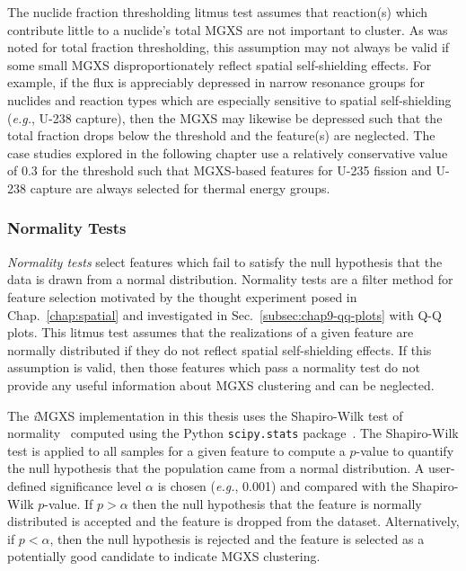The nuclide fraction thresholding litmus test assumes that reaction(s) which contribute little to a nuclide's total \ac{MGXS} are not important to cluster. As was noted for total fraction thresholding, this assumption may not always be valid if some small \ac{MGXS} disproportionately reflect spatial self-shielding effects. For example, if the flux is appreciably depressed in narrow resonance groups for nuclides and reaction types which are especially sensitive to spatial self-shielding (\textit{e.g.}, U-238 capture), then the \ac{MGXS} may likewise be depressed such that the total fraction drops below the threshold and the feature(s) are neglected. The case studies explored in the following chapter use a relatively conservative value of 0.3 for the threshold such that \ac{MGXS}-based features for U-235 fission and U-238 capture are always selected for thermal energy groups.

\subsubsection{Normality Tests}
\label{subsubsec:chap10-litmus-normality}

\textit{Normality tests} select features which fail to satisfy the null hypothesis that the data is drawn from a normal distribution. Normality tests are a filter method for feature selection motivated by the thought experiment posed in Chap.~\ref{chap:spatial} and investigated in Sec.~\ref{subsec:chap9-qq-plots} with \ac{Q-Q} plots. This litmus test assumes that the realizations of a given feature are normally distributed if they do not reflect spatial self-shielding effects. If this assumption is valid, then those features which pass a normality test do not provide any useful information about \ac{MGXS} clustering and can be neglected.

The \textit{i}\ac{MGXS} implementation in this thesis uses the Shapiro-Wilk test of normality~\cite{shapiro1965analysis} computed using the Python \texttt{scipy.stats} package~\cite{jones2011scipy}. The Shapiro-Wilk test is applied to all samples for a given feature to compute a $p$-value to quantify the null hypothesis that the population came from a normal distribution. A user-defined significance level $\alpha$ is chosen (\textit{e.g.}, 0.001) and compared with the Shapiro-Wilk $p$-value. If $p > \alpha$ then the null hypothesis that the feature is normally distributed is accepted and the feature is dropped from the dataset. Alternatively, if $p < \alpha$, then the null hypothesis is rejected and the feature is selected as a potentially good candidate to indicate \ac{MGXS} clustering.

